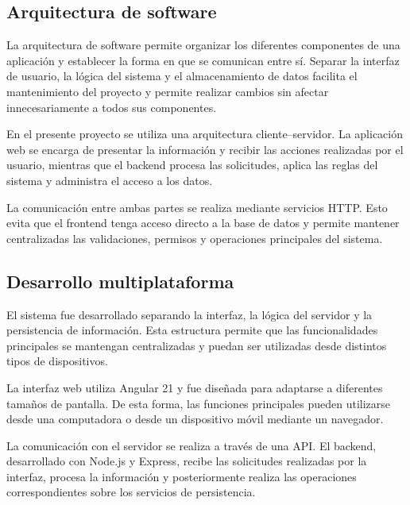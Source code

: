 
\subsection{Arquitectura de software}

La arquitectura de software permite organizar los diferentes componentes
de una aplicación y establecer la forma en que se comunican entre sí.
Separar la interfaz de usuario, la lógica del sistema y el almacenamiento
de datos facilita el mantenimiento del proyecto y permite realizar cambios
sin afectar innecesariamente a todos sus componentes.

En el presente proyecto se utiliza una arquitectura cliente--servidor.
La aplicación web se encarga de presentar la información y recibir las
acciones realizadas por el usuario, mientras que el backend procesa las
solicitudes, aplica las reglas del sistema y administra el acceso a los
datos.

La comunicación entre ambas partes se realiza mediante servicios HTTP.
Esto evita que el frontend tenga acceso directo a la base de datos y
permite mantener centralizadas las validaciones, permisos y operaciones
principales del sistema.



\subsection{Desarrollo multiplataforma}

El sistema fue desarrollado separando la interfaz, la lógica del servidor
y la persistencia de información. Esta estructura permite que las
funcionalidades principales se mantengan centralizadas y puedan ser
utilizadas desde distintos tipos de dispositivos.

La interfaz web utiliza Angular 21 y fue diseñada para adaptarse a
diferentes tamaños de pantalla. De esta forma, las funciones principales
pueden utilizarse desde una computadora o desde un dispositivo móvil
mediante un navegador.

La comunicación con el servidor se realiza a través de una API. El backend,
desarrollado con Node.js y Express, recibe las solicitudes realizadas por
la interfaz, procesa la información y posteriormente realiza las operaciones
correspondientes sobre los servicios de persistencia.

